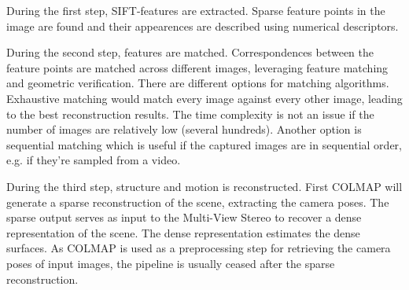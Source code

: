 During the first step, SIFT-features \cite{Lowe2004} are extracted. Sparse feature points in the image are found and their appearences are described using numerical descriptors.


During the second step, features are matched. Correspondences between the feature points are matched across different images, leveraging feature matching and geometric verification. There are different options for matching algorithms. Exhaustive matching would match every image against every other image, leading to the best reconstruction results. The time complexity is not an issue if the number of images are relatively low (several hundreds). Another option is sequential matching which is useful if the captured images are in sequential order, e.g. if they're sampled from a video.

During the third step, structure and motion is reconstructed. First COLMAP will generate a sparse reconstruction of the scene, extracting the camera poses. The sparse output serves as input to the Multi-View Stereo to recover a dense representation of the scene. The dense representation estimates the dense surfaces. As COLMAP is used as a preprocessing step for retrieving the camera poses of input images, the pipeline is usually ceased after the sparse reconstruction.



\begin{comment}
Exhaustive matching:
time complexity: O(n^2), where n is the number of images
memory complexity: O(n) for storing all images, O(n^2) for storing the results of the matching process

Sequential matching:
time complexity: O(n * k), where n is the number of images and k is the number of adjacent images each image is matched against
memory complexity: O(n * k)

Vocabulary tree-based matching:
time complexity: O(n^2), assuming that the size of the vocabulary tree is constant and not a function of the number n of images
memory complexity: O(n * k), where k is the number of top-retrieved images that each image is matched against
There is definitively literature on the topic of the time and memory complexity of vocabulary tree-based matching and image retrieval
\end{comment}




